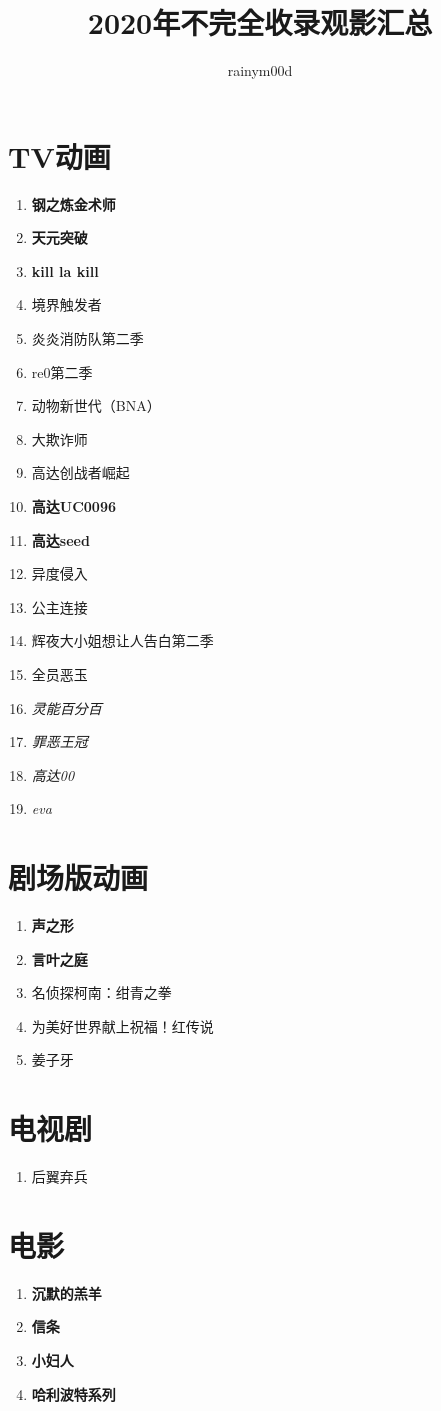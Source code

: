 \documentclass[UTF8]{ctexart}
\title{2020年不完全收录观影汇总}
\author{rainym00d}
\begin{document}
    \maketitle
    \tableofcontents
    \newpage
    \section{TV动画}
    \begin{enumerate}
        \item \textbf{钢之炼金术师}
        \item \textbf{天元突破}
        \item \textbf{kill la kill}
        \item 境界触发者
        \item 炎炎消防队第二季
        \item re0第二季
        \item 动物新世代（BNA）
        \item 大欺诈师
        \item 高达创战者崛起
        \item \textbf{高达UC0096}
        \item \textbf{高达seed}
        \item 异度侵入
        \item 公主连接
        \item 辉夜大小姐想让人告白第二季
        \item 全员恶玉
        \item \emph{灵能百分百}
        \item \emph{罪恶王冠}
        \item \emph{高达00}
        \item \emph{eva}
    \end{enumerate}
    \section{剧场版动画}
    \begin{enumerate}
        \item \textbf{声之形}
        \item \textbf{言叶之庭}
        \item 名侦探柯南：绀青之拳
        \item 为美好世界献上祝福！红传说
        \item 姜子牙
    \end{enumerate}
    \section{电视剧}
    \begin{enumerate}
        \item 后翼弃兵
    \end{enumerate}
    \section{电影}
    \begin{enumerate}
        \item \textbf{沉默的羔羊}
        \item \textbf{信条}
        \item \textbf{小妇人}
        \item \textbf{哈利波特系列}
    \end{enumerate}
\end{document}
